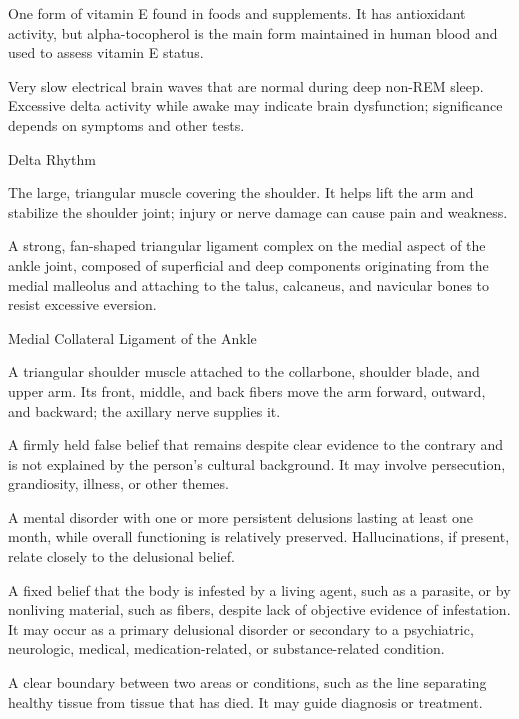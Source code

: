  One form of vitamin E found in foods and supplements. It has antioxidant activity, but alpha-tocopherol is the main form maintained in human blood and used to assess vitamin E status.

 Very slow electrical brain waves that are normal during deep non-REM sleep. Excessive delta activity while awake may indicate brain dysfunction; significance depends on symptoms and other tests.

\synonyms
Delta Rhythm

 The large, triangular muscle covering the shoulder. It helps lift the arm and stabilize the shoulder joint; injury or nerve damage can cause pain and weakness.

 A strong, fan-shaped triangular ligament complex on the medial aspect of the ankle joint, composed of superficial and deep components originating from the medial malleolus and attaching to the talus, calcaneus, and navicular bones to resist excessive eversion.

\synonyms
Medial Collateral Ligament of the Ankle

 A triangular shoulder muscle attached to the collarbone, shoulder blade, and upper arm. Its front, middle, and back fibers move the arm forward, outward, and backward; the axillary nerve supplies it.

 A firmly held false belief that remains despite clear evidence to the contrary and is not explained by the person’s cultural background. It may involve persecution, grandiosity, illness, or other themes.

 A mental disorder with one or more persistent delusions lasting at least one month, while overall functioning is relatively preserved. Hallucinations, if present, relate closely to the delusional belief.

 A fixed belief that the body is infested by a living agent, such as a parasite,
or by nonliving material, such as fibers, despite lack of objective evidence of infestation.
It may occur as a primary delusional disorder or secondary to a psychiatric, neurologic, medical,
medication-related, or substance-related condition.

 A clear boundary between two areas or conditions, such as the line separating healthy tissue from tissue that has died. It may guide diagnosis or treatment.

